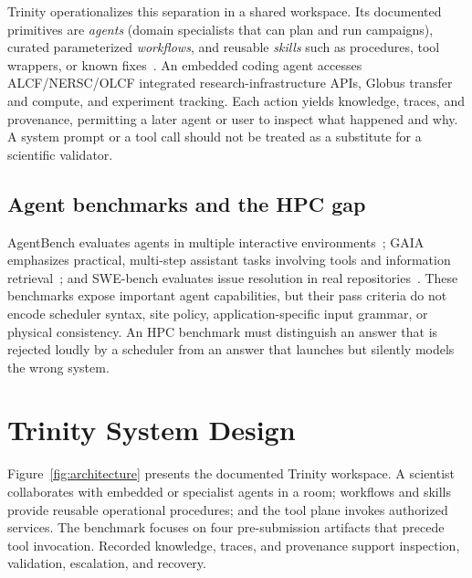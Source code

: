\documentclass[conference]{IEEEtran}
\begin{document}
Trinity operationalizes this separation in a shared workspace. Its documented primitives are \emph{agents} (domain specialists that can plan and run campaigns), curated parameterized \emph{workflows}, and reusable \emph{skills} such as procedures, tool wrappers, or known fixes~\cite{trinitydocs}. An embedded coding agent accesses ALCF/NERSC/OLCF integrated research-infrastructure APIs, Globus transfer and compute, and experiment tracking. Each action yields knowledge, traces, and provenance, permitting a later agent or user to inspect what happened and why. A system prompt or a tool call should not be treated as a substitute for a scientific validator.

\subsection{Agent benchmarks and the HPC gap}
AgentBench evaluates agents in multiple interactive environments~\cite{liu2024agentbench}; GAIA emphasizes practical, multi-step assistant tasks involving tools and information retrieval~\cite{mialon2024gaia}; and SWE-bench evaluates issue resolution in real repositories~\cite{jimenez2024swebench}. These benchmarks expose important agent capabilities, but their pass criteria do not encode scheduler syntax, site policy, application-specific input grammar, or physical consistency. An HPC benchmark must distinguish an answer that is rejected loudly by a scheduler from an answer that launches but silently models the wrong system.

\section{Trinity System Design}
\label{sec:design}
Figure~\ref{fig:architecture} presents the documented Trinity workspace. A scientist collaborates with embedded or specialist agents in a room; workflows and skills provide reusable operational procedures; and the tool plane invokes authorized services. The benchmark focuses on four pre-submission artifacts that precede tool invocation. Recorded knowledge, traces, and provenance support inspection, validation, escalation, and recovery.
\end{document}
